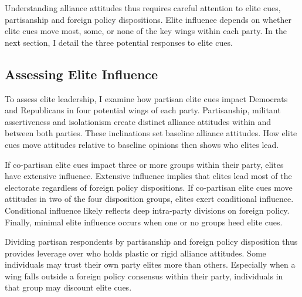\documentclass[12pt]{article}
\begin{document}
Understanding alliance attitudes thus requires careful attention to elite cues, partisanship and foreign policy dispositions. 
Elite influence depends on whether elite cues move most, some, or none of the key wings within each party. 
In the next section, I detail the three potential responses to elite cues. 






\subsection{Assessing Elite Influence}


To assess elite leadership, I examine how partisan elite cues impact Democrats and Republicans in four potential wings of each party.
Partisanship, militant assertiveness and isolationism create distinct alliance attitudes within and between both parties. 
These inclinations set baseline alliance attitudes. 
How elite cues move attitudes relative to baseline opinions then shows who elites lead. 


If co-partisan elite cues impact three or more groups within their party, elites have extensive influence. 
Extensive influence implies that elites lead most of the electorate regardless of foreign policy dispositions. 
If co-partisan elite cues move attitudes in two of the four disposition groups, elites exert conditional influence. 
Conditional influence likely reflects deep intra-party divisions on foreign policy. 
Finally, minimal elite influence occurs when one or no groups heed elite cues.


Dividing partisan respondents by partisanship and foreign policy disposition thus provides leverage over who holds plastic or rigid alliance attitudes. 
Some individuals may trust their own party elites more than others. 
Especially when a wing falls outside a foreign policy consensus within their party, individuals in that group may discount elite cues.
\end{document}
